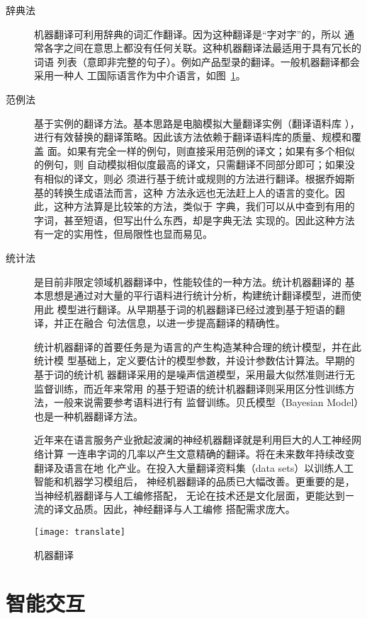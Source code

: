 \documentclass[../main]{subfiles}
\begin{document}
\begin{description}
  \item[辞典法]机器翻译可利用辞典的词汇作翻译。因为这种翻译是“字对字”的，所以
    通常各字之间在意思上都没有任何关联。这种机器翻译法最适用于具有冗长的词语
    列表（意即非完整的句子）。例如产品型录的翻译。一般机器翻译都会采用一种人
    工国际语言作为中介语言，如图~\ref{fig:translate}。
  \item[范例法]基于实例的翻译方法。基本思路是电脑模拟大量翻译实例（翻译语料库
    ），进行有效替换的翻译策略。因此该方法依赖于翻译语料库的质量、规模和覆盖
    面。如果有完全一样的例句，则直接采用范例的译文；如果有多个相似的例句，则
    自动模拟相似度最高的译文，只需翻译不同部分即可；如果没有相似的译文，则必
    须进行基于统计或规则的方法进行翻译。根据乔姆斯基的转换生成语法而言，这种
    方法永远也无法赶上人的语言的变化。因此，这种方法算是比较笨的方法，类似于
    字典，我们可以从中查到有用的字词，甚至短语，但写出什么东西，却是字典无法
    实现的。因此这种方法有一定的实用性，但局限性也显而易见。
  \item[统计法]是目前非限定领域机器翻译中，性能较佳的一种方法。统计机器翻译的
    基本思想是通过对大量的平行语料进行统计分析，构建统计翻译模型，进而使用此
    模型进行翻译。从早期基于词的机器翻译已经过渡到基于短语的翻译，并正在融合
    句法信息，以进一步提高翻译的精确性。

    统计机器翻译的首要任务是为语言的产生构造某种合理的统计模型，并在此统计模
    型基础上，定义要估计的模型参数，并设计参数估计算法。早期的基于词的统计机
    器翻译采用的是噪声信道模型，采用最大似然准则进行无监督训练，而近年来常用
    的基于短语的统计机器翻译则采用区分性训练方法，一般来说需要参考语料进行有
    监督训练。贝氏模型（Bayesian Model）也是一种机器翻译方法。

    近年来在语言服务产业掀起波澜的神经机器翻译就是利用巨大的人工神经网络计算
    一连串字词的几率以产生文意精确的翻译。将在未来数年持续改变翻译及语言在地
    化产业。在投入大量翻译资料集（data sets）以训练人工智能和机器学习模组后，
    神经机器翻译的品质已大幅改善。更重要的是，当神经机器翻译与人工编修搭配，
    无论在技术还是文化层面，更能达到ㄧ流的译文品质。因此，神经翻译与人工编修
    搭配需求庞大。
\end{description}

\begin{figure}[htbp]
  \centering
  \texttt{[image: translate]}
  \caption{机器翻译}%
  \label{fig:translate}
\end{figure}

\section{智能交互}%
\label{sec:assistant}
\end{document}
